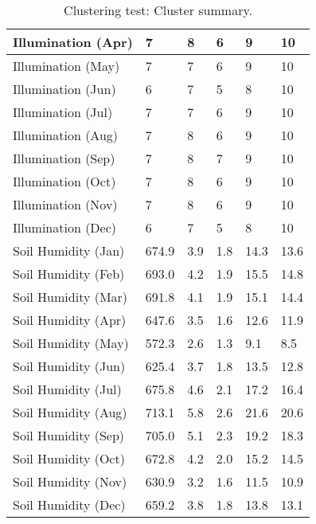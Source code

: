 \begin{table}[]
\begin{tabular}{|p{5cm}|p{2cm}|p{2cm}|p{2cm}|p{2cm}|p{2cm}|}
		\hline
  	    Illumination (Apr) & 7 & 8 & 6 & 9 & 10 \\
		\hline
  	    Illumination (May) & 7 & 7 & 6 & 9 & 10 \\
		\hline
		Illumination (Jun) & 6 & 7 & 5 & 8 & 10 \\
		\hline
		Illumination (Jul) & 7 & 7 & 6 & 9 & 10 \\
		\hline
		Illumination (Aug) & 7 & 8 & 6 & 9 & 10 \\
		\hline
		Illumination (Sep) & 7 & 8 & 7 & 9 & 10 \\
		\hline
		Illumination (Oct) & 7 & 8 & 6 & 9 & 10 \\
		\hline
		Illumination (Nov) & 7 & 8 & 6 & 9 & 10 \\
		\hline
		Illumination (Dec) & 6 & 7 & 5 & 8 & 10 \\
		\hline
  	    Soil Humidity (Jan) & 674.9 & 3.9 & 1.8 & 14.3 & 13.6 \\
		\hline
  	    Soil Humidity (Feb) & 693.0 & 4.2 & 1.9 & 15.5 & 14.8 \\
		\hline
  	    Soil Humidity (Mar) & 691.8 & 4.1 & 1.9 & 15.1 & 14.4 \\
		\hline
  	    Soil Humidity (Apr) & 647.6 & 3.5 & 1.6 & 12.6 & 11.9 \\
		\hline
  	    Soil Humidity (May) & 572.3 & 2.6 & 1.3 & 9.1 & 8.5 \\
		\hline
  	    Soil Humidity (Jun) & 625.4 & 3.7 & 1.8 & 13.5 & 12.8 \\
		\hline
  	    Soil Humidity (Jul) & 675.8 & 4.6 & 2.1 & 17.2 & 16.4 \\
		\hline
  	    Soil Humidity (Aug) & 713.1 & 5.8 & 2.6 & 21.6 & 20.6 \\
		\hline
  	    Soil Humidity (Sep) & 705.0 & 5.1 & 2.3 & 19.2 & 18.3 \\
		\hline
  	    Soil Humidity (Oct) & 672.8 & 4.2 & 2.0 & 15.2 & 14.5 \\
		\hline
  	    Soil Humidity (Nov) & 630.9 & 3.2 & 1.6 & 11.5 & 10.9 \\
		\hline
  	    Soil Humidity (Dec) & 659.2 & 3.8 & 1.8 & 13.8 & 13.1\\
		\hline
		\end{tabular}
		\caption{Clustering test: Cluster summary.}
	  \label{tab:clustering_test_resulting_clusters}
\end{table}